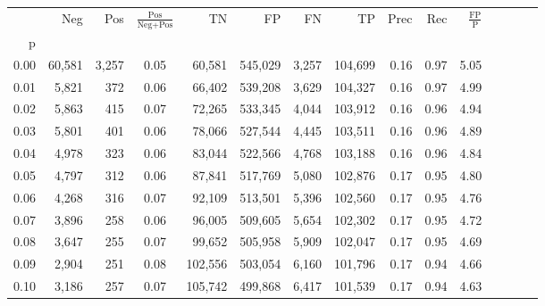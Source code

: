 \begin{tabular}{rrrcrrrrrrrrrrr}
\toprule
{} &     Neg &     Pos & $\frac{\text{Pos}}{\text{Neg}+\text{Pos}}$ &       TN &       FP &       FN &       TP &  Prec &   Rec & $\frac{\text{FP}}{\text{P}}$ \\
p    &         &         &                                            &          &          &          &          &       &       &                              \\
\midrule
0.00 &  60,581 &   3,257 &                                       0.05 &   60,581 &  545,029 &    3,257 &  104,699 &  0.16 &  0.97 &                         5.05 \\
0.01 &   5,821 &     372 &                                       0.06 &   66,402 &  539,208 &    3,629 &  104,327 &  0.16 &  0.97 &                         4.99 \\
0.02 &   5,863 &     415 &                                       0.07 &   72,265 &  533,345 &    4,044 &  103,912 &  0.16 &  0.96 &                         4.94 \\
0.03 &   5,801 &     401 &                                       0.06 &   78,066 &  527,544 &    4,445 &  103,511 &  0.16 &  0.96 &                         4.89 \\
0.04 &   4,978 &     323 &                                       0.06 &   83,044 &  522,566 &    4,768 &  103,188 &  0.16 &  0.96 &                         4.84 \\
0.05 &   4,797 &     312 &                                       0.06 &   87,841 &  517,769 &    5,080 &  102,876 &  0.17 &  0.95 &                         4.80 \\
0.06 &   4,268 &     316 &                                       0.07 &   92,109 &  513,501 &    5,396 &  102,560 &  0.17 &  0.95 &                         4.76 \\
0.07 &   3,896 &     258 &                                       0.06 &   96,005 &  509,605 &    5,654 &  102,302 &  0.17 &  0.95 &                         4.72 \\
0.08 &   3,647 &     255 &                                       0.07 &   99,652 &  505,958 &    5,909 &  102,047 &  0.17 &  0.95 &                         4.69 \\
0.09 &   2,904 &     251 &                                       0.08 &  102,556 &  503,054 &    6,160 &  101,796 &  0.17 &  0.94 &                         4.66 \\
0.10 &   3,186 &     257 &                                       0.07 &  105,742 &  499,868 &    6,417 &  101,539 &  0.17 &  0.94 &                         4.63 \\

\end{tabular}
